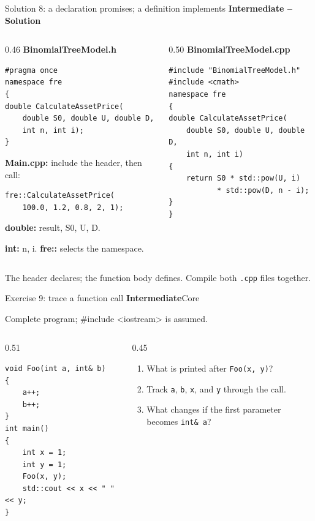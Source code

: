 \documentclass[10pt,aspectratio=169]{beamer}
\newcommand{\exerciseinfo}[2]{%
  \textbf{#1}\hfill{\small #2}\par
}
\newcommand{\solutioninfo}[1]{%
  {\color{MatrixGreen!75!black}\textbf{#1 -- Solution}}\par
}
\newcommand{\context}[1]{{\small #1\par}}
\begin{document}
\begin{frame}[fragile]{Solution 8: a declaration promises; a definition implements}
\relax
\solutioninfo{Intermediate}
\begin{columns}[T,onlytextwidth]
\begin{column}{0.46\textwidth}
\textbf{BinomialTreeModel.h}
\begin{lstlisting}[basicstyle=\ttfamily\fontsize{9.5}{10.5}\selectfont]
#pragma once
namespace fre
{
double CalculateAssetPrice(
    double S0, double U, double D,
    int n, int i);
}
\end{lstlisting}
{\small\textbf{Main.cpp:} include the header, then call:}
\begin{lstlisting}[basicstyle=\ttfamily\fontsize{9.5}{10.5}\selectfont]
fre::CalculateAssetPrice(
    100.0, 1.2, 0.8, 2, 1);
\end{lstlisting}
{\small\textbf{double:} result, S0, U, D.\par
\textbf{int:} n, i. \quad \textbf{fre::} selects the namespace.}
\end{column}
\begin{column}{0.50\textwidth}
\textbf{BinomialTreeModel.cpp}
\begin{lstlisting}[basicstyle=\ttfamily\fontsize{9.5}{10.5}\selectfont]
#include "BinomialTreeModel.h"
#include <cmath>
namespace fre
{
double CalculateAssetPrice(
    double S0, double U, double D,
    int n, int i)
{
    return S0 * std::pow(U, i)
           * std::pow(D, n - i);
}
}
\end{lstlisting}
\end{column}
\end{columns}
\smallskip
{\small The header declares; the function body defines. Compile both \texttt{.cpp} files together.}
\end{frame}

\begin{frame}[fragile]{Exercise 9: trace a function call}
\relax
\exerciseinfo{Intermediate}{Core}
\context{Complete program; \#include <iostream> is assumed.}
\begin{columns}[T,onlytextwidth]
\begin{column}{0.51\textwidth}
\begin{lstlisting}
void Foo(int a, int& b)
{
    a++;
    b++;
}
int main()
{
    int x = 1;
    int y = 1;
    Foo(x, y);
    std::cout << x << " " << y;
}
\end{lstlisting}
\end{column}
\begin{column}{0.45\textwidth}
\begin{enumerate}
\item What is printed after \texttt{Foo(x, y)}?
\item Track \texttt{a}, \texttt{b}, \texttt{x}, and \texttt{y} through the call.
\item What changes if the first parameter becomes \texttt{int\& a}?
\end{enumerate}
\end{column}
\end{columns}
\end{frame}
\end{document}
